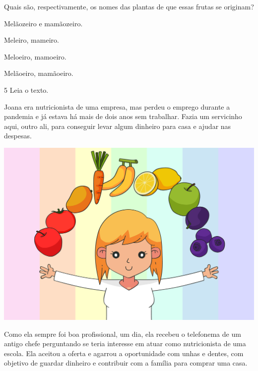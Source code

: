 
Quais são, respectivamente, os nomes das plantas de que essas frutas se originam?

\begin{escolha}
\item Melãozeiro e mamãozeiro.

\item Meleiro, mameiro.

\item Meloeiro, mamoeiro.

\item Melãoeiro, mamãoeiro.
\end{escolha}

\pagebreak
\num{5} Leia o texto.

\begin{myquote}
Joana era nutricionista de uma empresa, mas perdeu o emprego durante a
pandemia e já estava há mais de dois anos sem trabalhar. Fazia um
servicinho aqui, outro ali, para conseguir levar algum dinheiro para
casa e ajudar nas despesas.

\begin{center}
\includegraphics[width=\textwidth]{./media/image24a.jpeg}
\end{center}

Como ela sempre foi boa profissional, um dia, ela recebeu o telefonema de
um antigo chefe perguntando se teria interesse em atuar como
nutricionista de uma escola. Ela aceitou a oferta e agarrou a
oportunidade com unhas e dentes, com objetivo de guardar dinheiro e
contribuir com a família para comprar uma casa.

\end{myquote}

